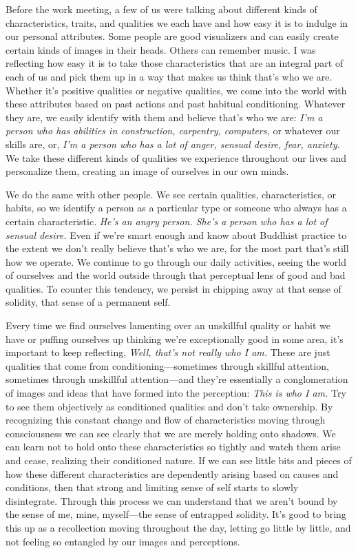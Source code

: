 Before the work meeting, a few of us were talking about different kinds 
of characteristics, traits, and qualities we each have and how easy it 
is to indulge in our personal attributes. Some people are good 
visualizers and can easily create certain kinds of images in their 
heads. Others can remember music. I was reflecting how easy it is to 
take those characteristics that are an integral part of each of us and 
pick them up in a way that makes us think that's who we are. Whether 
it's positive qualities or negative qualities, we come into the world 
with these attributes based on past actions and past habitual 
conditioning. Whatever they are, we easily identify with them and 
believe that's who we are: \emph{I'm a person who has abilities in 
construction, carpentry, computers,} or whatever our skills are, or, 
\emph{I'm a person who has a lot of anger, sensual desire, fear, 
anxiety.} We take these different kinds of qualities we experience 
throughout our lives and personalize them, creating an image of 
ourselves in our own minds.

We do the same with other people. We see certain qualities, 
characteristics, or habits, so we identify a person as a particular 
type or someone who always has a certain characteristic. \emph{He's an 
angry person. She's a person who has a lot of sensual desire.} Even if 
we're smart enough and know about Buddhist practice to the extent we 
don't really believe that's who we are, for the most part that's still 
how we operate. We continue to go through our daily activities, seeing 
the world of ourselves and the world outside through that perceptual 
lens of good and bad qualities. To counter this tendency, we persist in 
chipping away at that sense of solidity, that sense of a permanent self.

Every time we find ourselves lamenting over an unskillful quality or 
habit we have or puffing ourselves up thinking we're exceptionally good 
in some area, it's important to keep reflecting, \emph{Well, that's not 
really who I am.} These are just qualities that come from 
conditioning---sometimes through skillful attention, sometimes through 
unskillful attention---and they're essentially a conglomeration of 
images and ideas that have formed into the perception: \emph{This is 
who I am.} Try to see them objectively as conditioned qualities and 
don't take ownership. By recognizing this constant change and flow of 
characteristics moving through consciousness we can see clearly that we 
are merely holding onto shadows. We can learn not to hold onto these 
characteristics so tightly and watch them arise and cease, realizing 
their conditioned nature. If we can see little bits and pieces of how 
these different characteristics are dependently arising based on causes 
and conditions, then that strong and limiting sense of self starts to 
slowly disintegrate. Through this process we can understand that we 
aren't bound by the sense of me, mine, myself---the sense of entrapped 
solidity. It's good to bring this up as a recollection moving 
throughout the day, letting go little by little, and not feeling so 
entangled by our images and perceptions.

